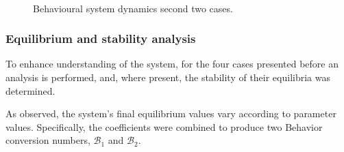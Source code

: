 \begin{figure}[h]
	\centering
	 \quad
	 \\
		\caption[Behavioural model simulation second]{Behavioural system dynamics second two cases.}
	\label{fig:model__behavior_sim_2}
\end{figure}

\subsubsection{Equilibrium and stability analysis}
To enhance understanding of the system, for the four cases presented before an analysis is performed, and, where present, the stability of their equilibria was determined.

As observed, the system’s final equilibrium values vary according to parameter values. Specifically, the coefficients were combined to produce two Behavior conversion numbers, $\mathcal{B}_1$ and $\mathcal{B}_2$.

